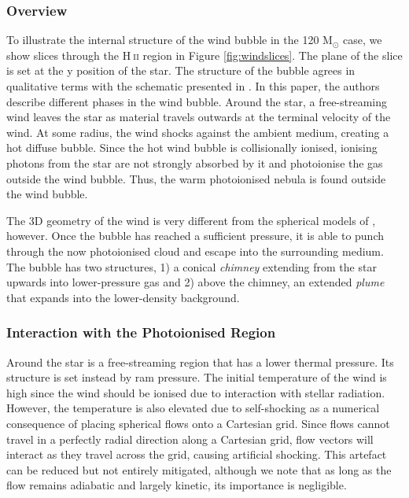 \documentclass[a4paper,fleqn,usenatbib]{mnras}
\newcommand{\Msolar}{M$_{\odot}$\xspace}
\newcommand{\HII}{H$~$\textsc{ii}\xspace}
\begin{document}
\subsubsection{Overview}
\label{results:evolutionwindbubble:overview}

To illustrate the internal structure of the wind bubble in the 120 \Msolar case, we show slices through the \HII region in Figure \ref{fig:windslices}. The plane of the slice is set at the y position of the star. The structure of the bubble agrees in qualitative terms with the schematic presented in \cite{Weaver1977}. In this paper, the authors describe different phases in the wind bubble. Around the star, a free-streaming wind leaves the star as material travels outwards at the terminal velocity of the wind. At some radius, the wind shocks against the ambient medium, creating a hot diffuse bubble. Since the hot wind bubble is collisionally ionised, ionising photons from the star are not strongly absorbed by it and photoionise the gas outside the wind bubble. Thus, the warm photoionised nebula is found outside the wind bubble.

The 3D geometry of the wind is very different from the spherical models of \cite{Weaver1977}, however. Once the bubble has reached a sufficient pressure, it is able to punch through the now photoionised cloud and escape into the surrounding medium. The bubble has two structures, 1) a conical \textit{chimney} extending from the star upwards into lower-pressure gas and 2) above the chimney, an extended \textit{plume} that expands into the lower-density background.

\subsubsection{Interaction with the Photoionised Region}
\label{results:evolutionwindbubble:interaction}

Around the star is a free-streaming region that has a lower thermal pressure. Its structure is set instead by ram pressure. The initial temperature of the wind is high since the wind should be ionised due to interaction with stellar radiation. However, the temperature is also elevated due to self-shocking as a numerical consequence of placing spherical flows onto a Cartesian grid. Since flows cannot travel in a perfectly radial direction along a Cartesian grid, flow vectors will interact as they travel across the grid, causing artificial shocking. This artefact can be reduced but not entirely mitigated, although we note that as long as the flow remains adiabatic and largely kinetic, its importance is negligible.
\end{document}
